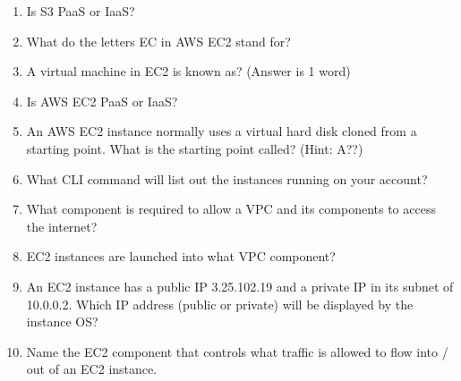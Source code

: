 \documentclass{pgnotes}
\begin{document}
\begin{enumerate}
\item Is S3 PaaS or IaaS?

\item What do the letters EC in AWS EC2 stand for?

\item A virtual machine in EC2 is known as? (Answer is 1 word)

\item Is AWS EC2 PaaS or IaaS?

\item An AWS EC2 instance normally uses a virtual hard disk cloned from a starting point.
  What is the starting point called? (Hint: A??)

\item What CLI command will list out the instances running on your account? 
  
\item What component is required to allow a VPC and its components to access the internet?

\item EC2 instances are launched into what VPC component?
  
\item An EC2 instance has a public IP 3.25.102.19 and a private IP in its subnet of 10.0.0.2.
  Which IP address (public or private) will be displayed by the instance OS?

\item Name the EC2 component that controls what traffic is allowed to flow into / out of an EC2 instance.
  
\end{enumerate}
\end{document}

